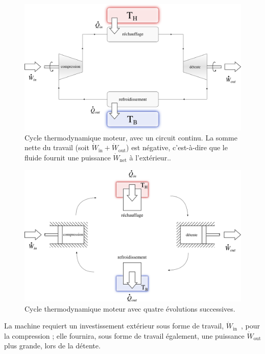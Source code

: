 		\begin{figure}
			\begin{center}
				\includegraphics[width=\textwidth]{images/mot_so_1.png}
			\end{center}
			\caption{Cycle thermodynamique moteur, avec un circuit continu.
		La somme nette du travail (soit	$\dot{W}_\text{in} + \dot{W}_\text{out}$) est négative, c’est-à-dire que le fluide fournit une puissance $\dot{W}_\text{net}$ à l’extérieur..}
			\label{fig_cycle_thermodynamique_du_moteur_so}
		\end{figure}

		\begin{figure}
			\begin{center}
				\includegraphics[width=\textwidth]{images/mot_sf_1.png}
			\end{center}
			\caption{Cycle thermodynamique moteur avec quatre évolutions successives.}
			\label{fig_cycle_thermodynamique_du_moteur_sf}
		\end{figure}

		La machine requiert un investissement extérieur sous forme de travail, $\dot{W}_\text{in}$~, pour la compression ; elle fournira, sous forme de travail également, une puissance $\dot{W}_\text{out}$ plus grande, lors de la détente.

